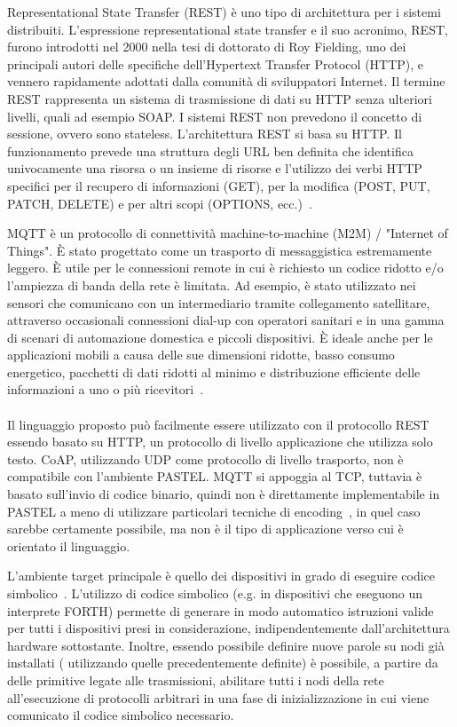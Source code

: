 \documentclass[10pt]{article}
\begin{document}
Representational State Transfer (REST) è uno tipo di architettura per i sistemi distribuiti. L'espressione representational state transfer e il suo acronimo, REST, furono introdotti nel 2000 nella tesi di dottorato di Roy Fielding, uno dei principali autori delle specifiche dell'Hypertext Transfer Protocol (HTTP), e vennero rapidamente adottati dalla comunità di sviluppatori Internet.
Il termine REST rappresenta un sistema di trasmissione di dati su HTTP senza ulteriori livelli, quali ad esempio SOAP. I sistemi REST non prevedono il concetto di sessione, ovvero sono stateless.
L'architettura REST si basa su HTTP. Il funzionamento prevede una struttura degli URL ben definita che identifica univocamente una risorsa o un insieme di risorse e l'utilizzo dei verbi HTTP specifici per il recupero di informazioni (GET), per la modifica (POST, PUT, PATCH, DELETE) e per altri scopi (OPTIONS, ecc.)~\cite{fielding2000architectural}.

MQTT è un protocollo di connettività machine-to-machine (M2M) / "Internet of Things". È stato progettato come un trasporto di messaggistica estremamente leggero. È utile per le connessioni  remote in cui è richiesto un codice ridotto e/o l'ampiezza di banda della rete è limitata. Ad esempio, è stato utilizzato nei sensori che comunicano con un intermediario tramite collegamento satellitare, attraverso occasionali connessioni dial-up con operatori sanitari e in una gamma di scenari di automazione domestica e piccoli dispositivi. È ideale anche per le applicazioni mobili a causa delle sue dimensioni ridotte, basso consumo energetico, pacchetti di dati ridotti al minimo e distribuzione efficiente delle informazioni a uno o più ricevitori~\cite{banks2019mqtt}.\\\\



Il linguaggio proposto può facilmente essere utilizzato con il protocollo REST essendo basato su HTTP, un protocollo di livello applicazione che utilizza solo testo. CoAP, utilizzando UDP come protocollo di livello trasporto, non è compatibile con l'ambiente PASTEL. MQTT si appoggia al TCP, tuttavia è basato sull'invio di codice binario, quindi non è direttamente implementabile in PASTEL a meno di utilizzare particolari tecniche di encoding~\cite{josefsson2006base16}, in quel caso sarebbe certamente possibile, ma non è il tipo di applicazione verso cui è orientato il linguaggio.

L'ambiente target principale è quello dei dispositivi in grado di eseguire codice simbolico~\cite{gaglio2017dc4cd}. L'utilizzo di codice simbolico (e.g. in dispositivi che eseguono un interprete FORTH) permette di generare in modo automatico istruzioni valide per tutti i dispositivi presi in considerazione, indipendentemente dall'architettura hardware sottostante.
Inoltre, essendo possibile definire nuove parole su nodi già installati ( utilizzando quelle precedentemente definite) è possibile, a partire da delle primitive legate alle trasmissioni, abilitare tutti i nodi della rete all'esecuzione di protocolli arbitrari in una fase di inizializzazione in cui viene comunicato il codice simbolico necessario. 
\end{document}
